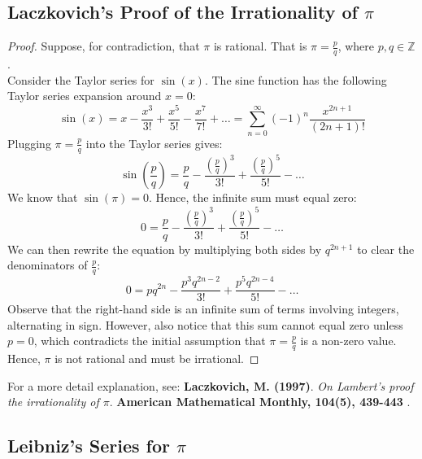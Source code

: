 \documentclass[12pt]{article}
\begin{document}
\subsection{Laczkovich's Proof of the Irrationality of $\pi$}
\begin{proof}
Suppose, for contradiction, that $\pi$ is rational. That is $\pi = \frac{p}{q}$, where $p, q \in \mathbb{Z}$.\\

\noindent Consider the Taylor series for $\sin(x)$. The sine function has the following Taylor series expansion around $x = 0$:
\begin{equation}
    \sin(x) = x - \frac{x^3}{3!} + \frac{x^5}{5!} - \frac{x^7}{7!} + \ldots = \sum_{n=0}^\infty (-1)^n \frac{x^{2n+1}}{(2n+1)!}
\end{equation}
Plugging $\pi = \frac{p}{q}$ into the Taylor series gives:
\begin{equation}
    \sin\left(\frac{p}{q}\right) = \frac{p}{q} - \frac{\left(\frac{p}{q}\right)^3}{3!} + \frac{\left(\frac{p}{q}\right)^5}{5!} - \ldots
\end{equation}
We know that $\sin(\pi) = 0$. Hence, the infinite sum must equal zero:
\begin{equation}
    0 = \frac{p}{q} - \frac{\left(\frac{p}{q}\right)^3}{3!} + \frac{\left(\frac{p}{q}\right)^5}{5!} - \ldots
\end{equation}
We can then rewrite the equation by multiplying both sides by $q^{2n+1}$ to clear the denominators of $\frac{p}{q}$:
\begin{equation}
    0 = pq^{2n} - \frac{p^3q^{2n-2}}{3!} + \frac{p^5q^{2n-4}}{5!} - \ldots
\end{equation}
Observe that the right-hand side is an infinite sum of terms involving integers, alternating in sign. However, also notice that this sum cannot equal zero unless $p = 0$, which contradicts the initial assumption that $\pi = \frac{p}{q}$ is a non-zero value.\\

\noindent Hence, $\pi$ is not rational and must be irrational.

\end{proof}

\noindent For a more detail explanation, see: 
\textbf{Laczkovich, M. (1997)}. \textit{On Lambert's proof the irrationality of $\pi$}. \textbf{American Mathematical Monthly, 104(5), 439-443} \cite{Laczkovich1997}.

\subsection{Leibniz's Series for $\pi$}
\end{document}
